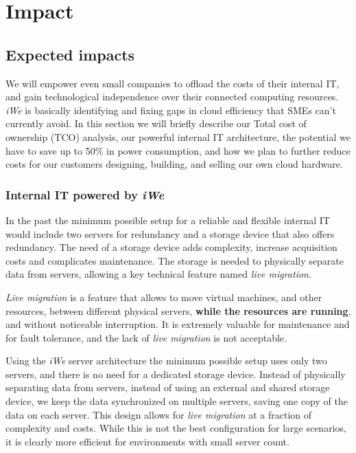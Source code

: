 \vspace{10ex}
\chapter{Impact}
\label{cha:impact}

\section{Expected impacts} 
\label{sec:expected-impact}


We will empower even small companies to offload the costs of their internal IT,
and gain technological independence over their connected computing resources.
\textit{iWe} is basically identifying and fixing gaps in cloud efficiency that
SMEs can't currently avoid.  In this section we will briefly describe our Total
cost of ownership (TCO) analysis, our powerful internal IT architecture, the
potential we have to save up to 50\% in power consumption, and how we plan to
further reduce costs for our customers designing, building, and selling our own
cloud hardware.

\subsection{Internal IT powered by \textit{iWe}} 
\label{subsec:iitic}

In the past the minimum possible setup for a reliable and flexible internal IT
would include two servers for redundancy and a storage device that also offers
redundancy. The need of a storage device adds complexity, increase acquisition
costs and complicates maintenance.  The storage is needed to physically separate
data from servers, allowing a key technical feature named \textit{live
migration}.

\textit{Live migration} is a feature that allows to move virtual machines, and
other resources, between different physical servers, \textbf{while the resources
are running}, and without noticeable interruption. It is extremely valuable for
maintenance and for fault tolerance, and the lack of \textit{live migration} is
not acceptable.

Using the \textit{iWe} server architecture the minimum possible setup uses
only two servers, and there is no need for a dedicated storage device. Instead
of physically separating data from servers, instead of using an external and
shared storage device, we keep the data synchronized on multiple servers, saving
one copy of the data on each server.  This design allows for \textit{live
migration} at a fraction of complexity and costs. While this is not the best
configuration for large scenarios, it is clearly more efficient for environments
with small server count.

